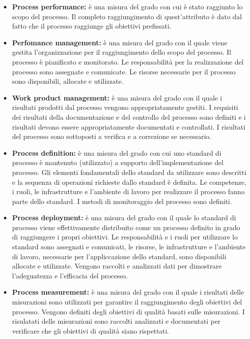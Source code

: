 	\begin{itemize}
	\item \textbf{Process performance:} è una misura del grado con cui è stato raggiunto lo scopo del processo. Il completo raggiungimento di quest'attributo è dato dal fatto che il processo raggiunge gli obiettivi prefissati.
	\item \textbf{Perfomance management:} è una misura del grado con il quale viene gestita l'organizzazione per il raggiungimento dello scopo del processo. Il processo è pianificato e monitorato. Le responsabilità per la realizzazione del processo sono assegnate e comunicate. Le risorse necessarie per il processo sono disponibili, allocate e utilizzate. 
	\item \textbf{Work product management:} è una misura del grado con il quale i risultati prodotti dal processo vengono appropriatamente gestiti. I requisiti dei risultati della documentazione e del controllo del processo sono definiti e i risultati devono essere appropriatamente documentati e controllati. I risultati del processo sono sottoposti a verifica e a correzione se necessario.
	\item \textbf{Process definition:} è una misura del grado con cui uno standard di processo è mantenuto (utilizzato) a supporto dell'implementazione del processo. Gli elementi fondamentali dello standard da utilizzare sono descritti e la sequenza di operazioni richieste dallo standard è definita. Le competenze, i ruoli, le infrastrutture e l'ambiente di lavoro per realizzare il processo fanno parte dello standard. I metodi di monitoraggio del processo sono definiti.
	\item \textbf{Process deployment:} è una misura del grado con il quale lo standard di processo viene effettivamente distribuito come un processo definito in grado di raggiungere i propri obiettivi. Le responsabilità e i ruoli per utilizzare lo standard sono assegnati e comunicati, le risorse, le infrastrutture e l'ambiente di lavoro, necessarie per l'appliccazione dello standard, sono disponibili allocate e utilizzate. Vengono raccolti e analizzati dati per dimostrare l'adeguatezza e l'efficacia del processo.
	\item \textbf{Process measurement:} è una misura del grado con il quale i risultati delle misurazioni sono utilizzati per garantire il raggiungimento degli obiettivi del processo. Vengono definiti degli obiettivi di qualità basati sulle misurazioni. I risulatati delle misurazioni sono raccolti analizzati e documentati per verificare che gli obiettivi di qualità siano rispettati.

\end{itemize}
